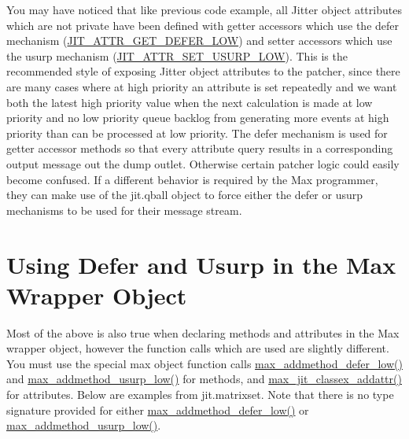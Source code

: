 You may have noticed that like previous code example, all Jitter object attributes which are not private have been defined with getter accessors which use the defer mechanism (\hyperlink{group__jitter_ga810447020b75b5173d4c6776cd2653d8}{JIT\_\-ATTR\_\-GET\_\-DEFER\_\-LOW}) and setter accessors which use the usurp mechanism (\hyperlink{group__jitter_ga2ffda4034665d46f65461d67b1004715}{JIT\_\-ATTR\_\-SET\_\-USURP\_\-LOW}). This is the recommended style of exposing Jitter object attributes to the patcher, since there are many cases where at high priority an attribute is set repeatedly and we want both the latest high priority value when the next calculation is made at low priority and no low priority queue backlog from generating more events at high priority than can be processed at low priority. The defer mechanism is used for getter accessor methods so that every attribute query results in a corresponding output message out the dump outlet. Otherwise certain patcher logic could easily become confused. If a different behavior is required by the Max programmer, they can make use of the jit.qball object to force either the defer or usurp mechanisms to be used for their message stream.\hypertarget{chapter_jit_sched_chapter_jit_sched_wrapper}{}\section{Using Defer and Usurp in the Max Wrapper Object}\label{chapter_jit_sched_chapter_jit_sched_wrapper}
Most of the above is also true when declaring methods and attributes in the Max wrapper object, however the function calls which are used are slightly different. You must use the special max object function calls \hyperlink{group__maxwrapmod_gac057d2e8d94686363fa9ae8ea0b41fee}{max\_\-addmethod\_\-defer\_\-low()} and \hyperlink{group__maxwrapmod_ga2c596151798123076dcd1d4f7d76e203}{max\_\-addmethod\_\-usurp\_\-low()} for methods, and \hyperlink{group__maxwrapmod_ga888aa461197db2e7ef2fb0ae34479c3e}{max\_\-jit\_\-classex\_\-addattr()} for attributes. Below are examples from jit.matrixset. Note that there is no type signature provided for either \hyperlink{group__maxwrapmod_gac057d2e8d94686363fa9ae8ea0b41fee}{max\_\-addmethod\_\-defer\_\-low()} or \hyperlink{group__maxwrapmod_ga2c596151798123076dcd1d4f7d76e203}{max\_\-addmethod\_\-usurp\_\-low()}.


